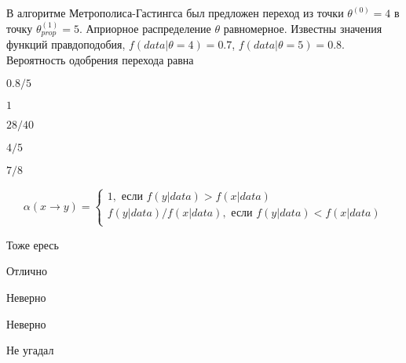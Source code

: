 
\begin{question}
В алгоритме Метрополиса-Гастингса был предложен переход из точки
\(\theta^{(0)}=4\) в точку \(\theta^{(1)}_{prop}=5\). Априорное
распределение \(\theta\) равномерное. Известны значения функций
правдоподобия, \(f(data|\theta=4)=0.7\), \(f(data|\theta=5)=0.8\).
Вероятность одобрения перехода равна
\begin{answerlist}
  \item \(0.8/5\)
  \item \(1\)
  \item \(28/40\)
  \item \(4/5\)
  \item \(7/8\)
\end{answerlist}
\end{question}

\begin{solution}
\[
\alpha(x \to y) = \begin{cases}
1, \text{ если } f(y|data) > f(x|data) \\
f(y|data) / f(x|data), \text{ если } f(y|data) < f(x|data) \\
\end{cases}
\]
\begin{answerlist}
  \item Тоже ересь
  \item Отлично
  \item Неверно
  \item Неверно
  \item Не угадал
\end{answerlist}
\end{solution}

